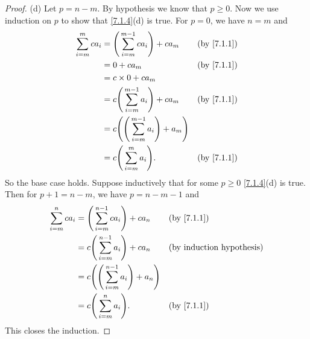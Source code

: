 \begin{proof}{(d)}
  Let \(p = n - m\).
  By hypothesis we know that \(p \geq 0\).
  Now we use induction on \(p\) to show that \cref{7.1.4}(d) is true.
  For \(p = 0\), we have \(n = m\) and
  \begin{align*}
    \sum_{i = m}^m ca_i & = \Bigg(\sum_{i = m}^{m - 1} ca_i\Bigg) + ca_m             &  & \by{7.1.1} \\
                        & = 0 + ca_m                                                 &  & \by{7.1.1} \\
                        & = c \times 0 + ca_m                                                        \\
                        & = c \Bigg(\sum_{i = m}^{m - 1} a_i\Bigg) + ca_m            &  & \by{7.1.1} \\
                        & = c \Bigg(\Bigg(\sum_{i = m}^{m - 1} a_i\Bigg) + a_m\Bigg)                 \\
                        & = c \Bigg(\sum_{i = m}^m a_i\Bigg).                        &  & \by{7.1.1}
  \end{align*}
  So the base case holds.
  Suppose inductively that for some \(p \geq 0\) \cref{7.1.4}(d) is true.
  Then for \(p + 1 = n - m\), we have \(p = n - m - 1\) and
  \begin{align*}
    \sum_{i = m}^n ca_i & = \Bigg(\sum_{i = m}^{n - 1} ca_i\Bigg) + ca_n             &  & \by{7.1.1} \\
                        & = c \Bigg(\sum_{i = m}^{n - 1} a_i\Bigg) + ca_n            &  & \byIH      \\
                        & = c \Bigg(\Bigg(\sum_{i = m}^{n - 1} a_i\Bigg) + a_n\Bigg)                 \\
                        & = c \Bigg(\sum_{i = m}^n a_i\Bigg).                        &  & \by{7.1.1}
  \end{align*}
  This closes the induction.
\end{proof}

